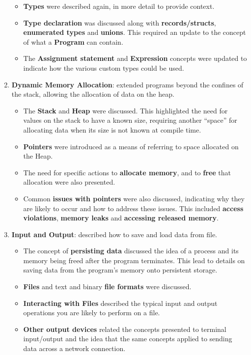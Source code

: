 \begin{enumerate}
  \begin{itemize}[noitemsep,nolistsep]
    \item \textbf{Types} were described again, in more detail to provide context. 
    \item \textbf{Type declaration} was discussed along with \textbf{records/structs}, \textbf{enumerated types} and \textbf{unions}. This required an update to the concept of what a \textbf{Program} can contain.
    \item The \textbf{Assignment statement} and \textbf{Expression} concepts were updated to indicate how the various custom types could be used.
  \end{itemize}
  \item \textbf{Dynamic Memory Allocation}: extended programs beyond the confines of the stack, allowing the allocation of data on the heap.
  \begin{itemize}[noitemsep,nolistsep]
    \item The \textbf{Stack} and \textbf{Heap} were discussed. This highlighted the need for values on the stack to have a known size, requiring another ``space'' for allocating data when its size is not known at compile time.
    \item \textbf{Pointers} were introduced as a means of referring to space allocated on the Heap.
    \item The need for specific actions to \textbf{allocate memory}, and to \textbf{free} that allocation were also presented.
    \item Common \textbf{issues with pointers} were also discussed, indicating why they are likely to occur and how to address these issues. This included \textbf{access violations}, \textbf{memory leaks} and \textbf{accessing released memory}. 
  \end{itemize}
  \item \textbf{Input and Output}: described how to save and load data from file.
  \begin{itemize}[noitemsep,nolistsep]
    \item The concept of \textbf{persisting data} discussed the idea of a process and its memory being freed after the program terminates. This lead to details on saving data from the program's memory onto persistent storage.
    \item \textbf{Files} and text and binary \textbf{file formats} were discussed. 
    \item \textbf{Interacting with Files} described the typical input and output operations you are likely to perform on a file.
    \item \textbf{Other output devices} related the concepts presented to terminal input/output and the idea that the same concepts applied to sending data across a network connection.
  \end{itemize}
\end{enumerate}

